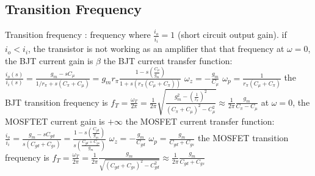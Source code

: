 \documentclass[a4paper,11pt]{article}
\begin{document}
	\subsection{Transition Frequency}
	\begin{outline}[enumerate]
		\1 Transition frequency : frequency where $\frac{i_{o}}{i_{i}} = 1$ (short circuit output gain). if $i_{o} < i_{i}$, the transistor is not working as an amplifier that that frequency
		\1 at $\omega = 0$, the BJT current gain is $\beta$
		\1 the BJT current transfer function: $\frac{i_{o}\left(s\right)}{i_{i}\left(s\right)} = \frac{g_{m} - sC_{\mu}}{1 / r_{\pi} + s \left( C_{\pi} + C_{\mu} \right)} = g_{m}r_{\pi} \frac{1 - s\left(\frac{C_{\mu}}{g_{m}}\right)}{1 + s \left(r_{\pi} \left(C_{\mu} + C_{\pi}\right)\right)}$
			\2 $\omega_{z} = -\frac{g_{m}}{C_{\mu}}$
			\2 $\omega_{p} = \frac{1}{r_{\pi}\left(C_{\mu} + C_{\pi}\right)}$
		\1 the BJT transition frequency is $f_{T} = \frac{\omega_{T}}{2\pi} = \frac{1}{2\pi} \sqrt{\frac{g_{m}^{2} - \left( \frac{1}{r_{\pi}} \right)^{2}}{\left(C_{\pi} + C_{\mu}\right)^{2} - C_{\mu}^{2}}} \approx \frac{1}{2\pi} \frac{g_{m}}{C_{\pi} - C_{\mu}}$
		\1 at $\omega = 0$, the MOSFTET current gain is $+\infty$
		\1 the MOSFET current transfer function: $\frac{i_{o}}{i_{i}} = \frac{g_{m} - sC_{gd}}{s\left(C_{gd} + C_{gs}\right)} = \frac{1 - s\left(\frac{C_{gd}}{g_{m}}\right)}{s\left(\frac{C_{gd} + C_{gs}}{g_{m}}\right)}$ 
			\2 $\omega_{z} = -\frac{g_{m}}{C_{gd}}$
			\2 $\omega_{p} = \frac{g_{m}}{C_{gd} + C_{gs}}$
		\1 the MOSFET transition frequency is  $f_{T} = \frac{\omega_{T}}{2\pi} = \frac{1}{2\pi}\frac{g_{m}}{\sqrt{\left(C_{gd} + C_{gs}\right)^{2} - C_{gd}^{2}}} \approx \frac{1}{2\pi} \frac{g_{m}}{C_{gd} + C_{gs}}$	
	\end{outline}
\end{document}
